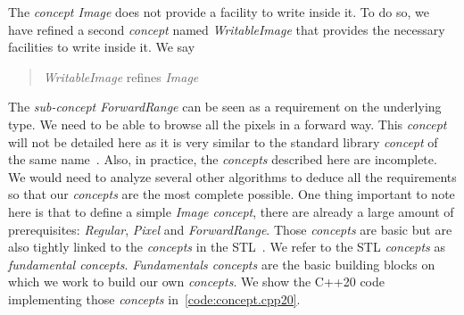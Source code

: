 The \emph{concept Image} does not provide a facility to write inside it. To do so, we have refined a second
\emph{concept} named \emph{WritableImage} that provides the necessary facilities to write inside it. We say
\blockquote{\emph{WritableImage} refines \emph{Image}}.

The \emph{sub-concept ForwardRange} can be seen as a requirement on the underlying type. We need to be able to browse
all the pixels in a forward way. This \emph{concept} will not be detailed here as it is very similar to the standard
library \emph{concept} of the same name~\parencite{niebler.2018.mergingranges,niebler.2018.deepranges}. Also, in
practice, the \emph{concepts} described here are incomplete. We would need to analyze several other algorithms to deduce
all the requirements so that our \emph{concepts} are the most complete possible. One thing important to note here is
that to define a simple \emph{Image concept}, there are already a large amount of prerequisites:
\label{term:regular}\emph{Regular}, \emph{Pixel} and \emph{ForwardRange}. Those \emph{concepts} are basic but are also
tightly linked to the \emph{concepts} in the STL~\parencite{carter.2018.concepts}. We refer to the STL \emph{concepts}
as \emph{fundamental concepts}. \emph{Fundamentals concepts} are the basic building blocks on which we work to build our
own \emph{concepts}. We show the C++20 code implementing those \emph{concepts} in~\cref{code:concept.cpp20}.

